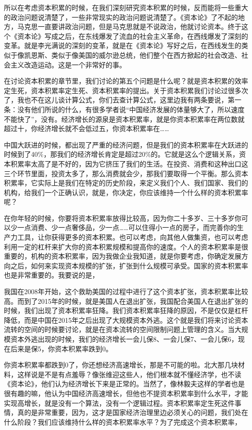 \documentclass[UTF8, 12pt, a4paper]{ctexrep}
\begin{document}
所以在考虑资本积累的时候，在我们深刻研究资本积累的时候，反而能将一些重大的政治问题说清楚了，一些非常现实的政治问题说清楚了。《资本论》了不起的地方，马克思一直要讲政治问题，但是马克思就是不说政治，他就讨论资本。终于这个《资本论》写成之后，在东线爆发了流血的社会主义革命，在西线爆发了深刻的变革。就是李光满说的深刻的变革，就是在《资本论》写好之后，在西线发生的类似于像凯恩斯、类似于像美国的威尔逊总统，他们整个在西方掀起的社会改造、社会主义改造运动。这是一个非常好的事。

在讨论资本积累的章节里，我们讨论的第五个问题是什么呢？就是资本积累的效率定生死，资本积累率定生死、资本积累率的提出。关于资本积累我们讨论过很多次了，我也不在这儿谈计算公式，你们去查计算公式，这里边我有两条要说，第一条：没有他们所说的什么，有很多学者说“中国经济发展的体量够大了，所以速度不能快了”，没有。经济增长的源泉是资本积累率，就是你资本积累率在两位数就超过十，你经济增长就不会低过五，你资本积累率在……

中国大跃进的时候，都出现了严重的经济问题，但是我们的资本积累率在大跃进的时候到了40\%，那我们的经济增长肯定是超过20\%的。它就是这么个逻辑关系，资本积累率太高了是不好的，因为它挤压了我们的生活。在投资、消费和这种出口这三个环节里面，投资太多了，那么消费就会少，那我们要取得一个平衡。那么资本积累率，它实际上是我们在特定的历史阶段，来定义我们个人、我们国家、我们的机构，给我们一个正确认识，就是，你决定，你应该维持一个什么样的资本积累率呢？

在你年轻的时候，你要将资本积累率放得比较高，因为你二十多岁、三十多岁你可以少一点消费、少一点奢侈品，少一点……可以住得小一点的房子，而完善你的生产力工具，让你获得更多的资本积累。也可以考虑，向其他人做集资，也可以考虑利用一定的杠杆来扩大你的资本积累规模和提高你的速度。个人的资本积累率是很重要的，机构的资本积累率，因为我做企业我知道，就是你要考虑，你确定发展方向之后，如何来实现资本规模的扩张，扩张到什么规模可承受。国家的资本积累率也是非常重要的。我要说的是，

我国在2008年开始，这个救助美国的过程中进行了这个资本扩张，资本积累率比较高。而到了2015年的时候，就是美国人在退出扩张，我国配合美国人在退出扩张的时候，我们出现了资本积累率狂降。我们资本积累率狂降的原因，不是仅仅是杠杆降低，而是中国在2015年之后出现了大规模资本外逃。这个就是我们将来讨论资本流转的空间的时候要讨论，就是在资本流转的空间限制问题上管理的含义。当大规模资本外逃出现的时候，我们的经济增长一会儿保8、一会儿保7、一会儿保6，现在后来是保5，你资本积累率跌到0。

你资本积累率都跌到0了，你还想经济高速增长，那是不可能的啦。北大那几块材料，这样说是不是有点羞辱？像张维迎这些人，他们根本就不懂经济学，也不读《资本论》，他们认为经济增长下来是正常的。当然了，像林毅夫这样的学者也是很有趣的嘛，他认为中国经济高速增长，但他也不提资本积累率到什么水平，才能实现高增长，就是没有一个算法，没有一个逻辑过程。资本积累率定生死这件事情，真的是非常重要，因为，这才是国家经济治理里边必须关心的问题，我们处在什么阶段？我们应该维持什么样的资本积累率水平？为了完成这个资本积累率，
\end{document}
